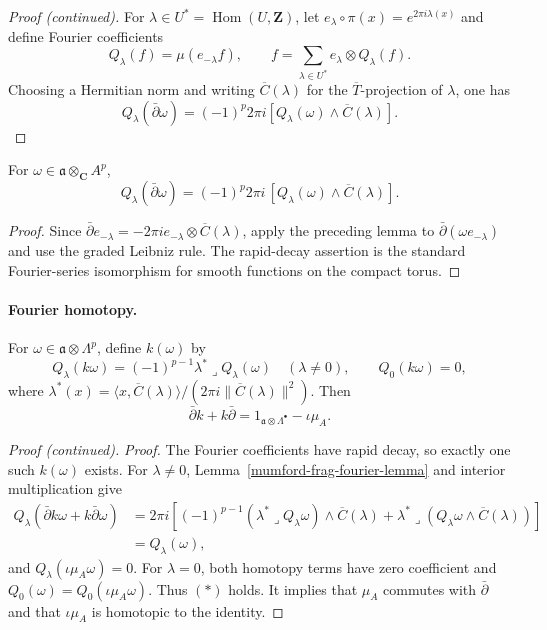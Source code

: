 \begin{proof}[Proof (continued)]
For $\lambda\in U^*=\operatorname{Hom}(U,\mathbf Z)$, let
$e_\lambda\circ\pi(x)=e^{2\pi i\lambda(x)}$ and define Fourier coefficients
\[
 Q_\lambda(f)=\mu(e_{-\lambda}f),
 \qquad f=\sum_{\lambda\in U^*}e_\lambda\otimes Q_\lambda(f).
\]
Choosing a Hermitian norm and writing $\overline C(\lambda)$ for the
$\overline T$-projection of $\lambda$, one has
\[
 Q_\lambda(\bar\partial\omega)=(-1)^p2\pi i
 [Q_\lambda(\omega)\wedge\overline C(\lambda)].
\]
\end{proof}

\begin{lemma}
\label{mumford-frag-fourier-lemma}
For $\omega\in\mathfrak a\otimes_{\mathbf C}A^p$,
\[
 Q_\lambda(\bar\partial\omega)=(-1)^p2\pi i\,
 [Q_\lambda(\omega)\wedge\overline C(\lambda)].
\]
\end{lemma}
\begin{proof}
Since $\bar\partial e_{-\lambda}=-2\pi i e_{-\lambda}\otimes
\overline C(\lambda)$, apply the preceding lemma to
$\bar\partial(\omega e_{-\lambda})$ and use the graded Leibniz rule.
The rapid-decay assertion is the standard Fourier-series isomorphism for
smooth functions on the compact torus.
\end{proof}

\paragraph{Fourier homotopy.}
For $\omega\in\mathfrak a\otimes\Lambda^p$, define $k(\omega)$ by
\[
 Q_\lambda(k\omega)=(-1)^{p-1}\lambda^*\mathbin{\lrcorner}Q_\lambda(\omega)
 \quad(\lambda\neq0),
 \qquad Q_0(k\omega)=0,
\]
where
$\lambda^*(x)=\langle x,\overline C(\lambda)\rangle/
(2\pi i\|\overline C(\lambda)\|^2)$.  Then
\[
 \bar\partial k+k\bar\partial=1_{\mathfrak a\otimes\Lambda^\bullet}-\iota\mu_A.
\tag{*}
\]
\begin{proof}[Proof (continued)]
\textit{Proof.}
The Fourier coefficients have rapid decay, so exactly one such $k(\omega)$
exists.  For $\lambda\neq0$, Lemma~\ref{mumford-frag-fourier-lemma} and
interior multiplication give
\[
\begin{aligned}
 Q_\lambda(\bar\partial k\omega+k\bar\partial\omega)
 &=2\pi i\left[(-1)^{p-1}(\lambda^*\mathbin{\lrcorner}Q_\lambda\omega)
 \wedge\overline C(\lambda)+\lambda^*\mathbin{\lrcorner}
 (Q_\lambda\omega\wedge\overline C(\lambda))\right]\\
 &=Q_\lambda(\omega),
\end{aligned}
\]
and $Q_\lambda(\iota\mu_A\omega)=0$.  For $\lambda=0$, both homotopy terms
have zero coefficient and $Q_0(\omega)=Q_0(\iota\mu_A\omega)$.  Thus $(*)$
holds.  It implies that $\mu_A$ commutes with $\bar\partial$ and that
$\iota\mu_A$ is homotopic to the identity.
\end{proof}

